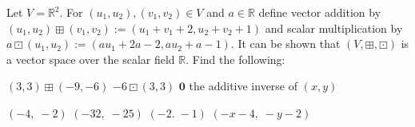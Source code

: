 
\begin{Exercise}[
name={},
title={}, 
difficulty=0,
origin={\cite{NS}}]
Let $V={\mathbb R}^2$. For $(u_1,u_2),(v_1,v_2) \in V$ and $a\in{\mathbb R}$ define vector addition by $(u_1,u_2) \boxplus (v_1,v_2) := (u_1+v_1 + 2,u_2+v_2 + 1)$ and scalar multiplication by $a \boxdot (u_1,u_2) := (au_1 + 2a - 2,au_2 + a - 1)$. It can be shown that $(V,\boxplus,\boxdot)$ is a vector space over the scalar field $\mathbb R$. Find the following:
\begin{multicols}{2}
\Question $(3,3)\boxplus (-9,-6)$
\Question $-6\boxdot (3,3)$
\Question $\mathbf{0}$
\Question the additive inverse of $(x,y)$
\EndCurrentQuestion
\end{multicols}
\end{Exercise}

\begin{Answer}
\begin{multicols}{2}
\Question $(-4,\;-2)$
\Question $(-32,\;-25)$
\Question $(-2.\;-1)$
\Question $(-x-4,\;-y-2)$
\EndCurrentQuestion
\end{multicols} 
\end{Answer}
